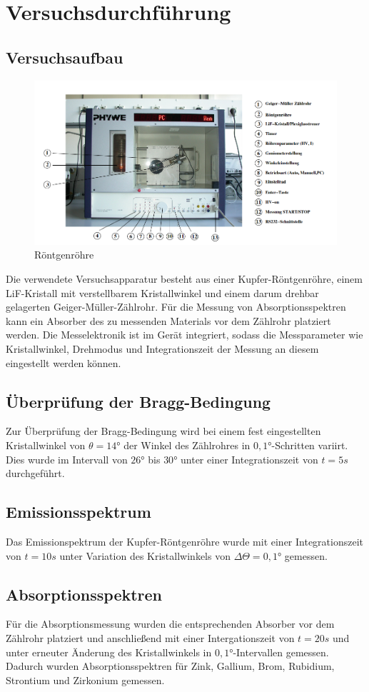 \section{Versuchsdurchführung}
\subsection{Versuchsaufbau}
\begin{figure}[h]
    \centering
    \includegraphics{Röntgenröhre}
    \caption{Röntgenröhre}
  \end{figure}
Die verwendete Versuchsapparatur besteht aus einer Kupfer-Röntgenröhre, einem LiF-Kristall mit verstellbarem Kristallwinkel und einem darum drehbar gelagerten Geiger-Müller-Zählrohr. Für die Messung von Absorptionsspektren kann ein Absorber des zu messenden Materials vor dem Zählrohr platziert werden. Die Messelektronik ist im Gerät integriert, sodass die Messparameter wie Kristallwinkel, Drehmodus und Integrationszeit der Messung an diesem eingestellt werden können.
\subsection{Überprüfung der Bragg-Bedingung}
Zur Überprüfung der Bragg-Bedingung wird bei einem fest eingestellten Kristallwinkel von $\theta=14°$ der Winkel des Zählrohres in $0,1°$-Schritten variirt. Dies wurde im Intervall von $26°$ bis $30°$ unter einer Integrationszeit von $t=5s$ durchgeführt.
\subsection{Emissionsspektrum}
Das Emissionspektrum der Kupfer-Röntgenröhre wurde mit einer Integrationszeit von $t=10s$ unter Variation des Kristallwinkels von $\Delta \Theta=0,1°$ gemessen.
\subsection{Absorptionsspektren}
Für die Absorptionsmessung wurden die entsprechenden Absorber vor dem Zählrohr platziert und anschließend mit einer Intergationszeit von $t=20s$ und unter erneuter Änderung des Kristallwinkels in $0,1°$-Intervallen gemessen. Dadurch wurden Absorptionsspektren für Zink, Gallium, Brom, Rubidium, Strontium und Zirkonium gemessen. 


  
